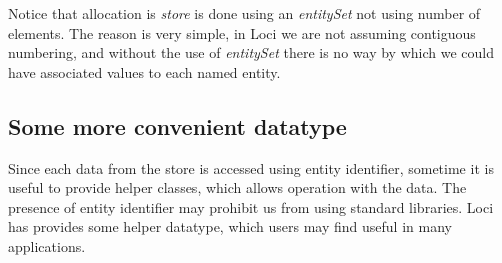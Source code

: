 \par Notice that  allocation is {\em store} is done using an {\em entitySet}
not using number of elements. The reason is very simple, in Loci we are not
assuming contiguous numbering, and without the use of {\em entitySet} there
is no way by which we could have associated values to each named entity.

\subsection { Some more convenient datatype }
\par Since each data from the store is accessed using entity identifier, sometime
it is useful to provide helper classes, which allows operation with the data. 
The presence of entity identifier may prohibit us from using standard libraries.
Loci has provides some helper datatype, which users may find useful in many
applications.
